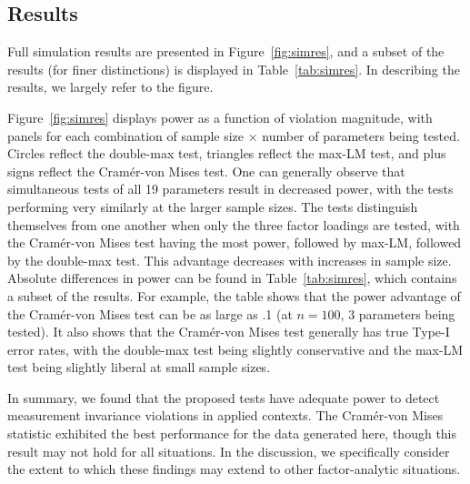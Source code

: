 \documentclass[man]{apa}
\begin{document}
\subsection{Results}
Full simulation results are presented in Figure~\ref{fig:simres}, and
a subset of the results (for finer distinctions) is displayed in
Table~\ref{tab:simres}.  In describing the results, we largely refer
to the figure.

Figure~\ref{fig:simres} displays power as a function of violation
magnitude, with panels for each combination of sample size $\times$
number of parameters being tested.  
Circles reflect the double-max test, triangles reflect the max-LM
test, and plus signs reflect the Cram{\'e}r-von Mises test.  One can
generally observe that simultaneous tests of all 19 parameters
result in decreased power, with the tests performing very similarly at
the larger sample sizes.  The tests distinguish themselves from one
another when only the three factor loadings are tested, with the
Cram\'{e}r-von Mises test having the most power, followed by max-LM,
followed by the double-max test.  This advantage decreases with
increases in sample size.  
Absolute differences in power can be found in Table~\ref{tab:simres},
which contains a subset of the results.  For example, the table shows that the
power advantage of the Cram\'{e}r-von
Mises test can be as large as .1 (at $n=100$, 3 parameters being
tested).  It also shows that the Cram\'{e}r-von Mises test generally
has true Type-I error rates, with the double-max test being slightly
conservative and the max-LM test being slightly liberal at small
sample sizes.

In summary, we found that the proposed tests have adequate power to detect
measurement invariance violations in applied contexts.  The 
Cram\'{e}r-von Mises statistic exhibited the best performance for the
data generated here, though this result may not hold for all
situations.  In the discussion, we specifically consider the extent to 
which these findings may extend to other factor-analytic situations.
\end{document}

